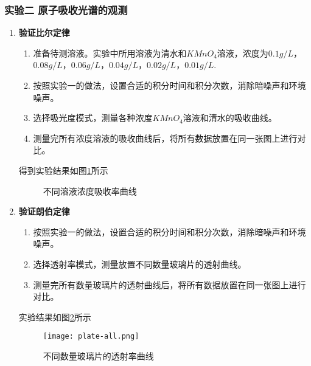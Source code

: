 \documentclass[dvipsnames, svgnames,a4paper,11pt]{article}
\begin{document}
		
		
	

	\subsubsection{实验二 \quad 原子吸收光谱的观测}

		\begin{enumerate}
			\item \textbf{验证比尔定律}
				
				\begin{enumerate}
					\item 准备待测溶液。实验中所用溶液为清水和$KMnO_4$溶液，浓度为$0.1g/L$，$0.08g/L$，$0.06g/L$，$0.04g/L$，$0.02g/L$，$0.01g/L$.
					
					\item 按照实验一的做法，设置合适的积分时间和积分次数，消除暗噪声和环境噪声。
					
					\item 选择吸光度模式，测量各种浓度$KMnO_4$溶液和清水的吸收曲线。
					
					\item 测量完所有浓度溶液的吸收曲线后，将所有数据放置在同一张图上进行对比。
					
				\end{enumerate}
				
				得到实验结果如图\ref{fig:Absorbance}所示
				
				\begin{figure}[htbp]
					\centering
					\caption{不同溶液浓度吸收率曲线}
					\label{fig:Absorbance}			
				\end{figure}
				
			\item \textbf{验证朗伯定律}
			
				\begin{enumerate}
					\item 按照实验一的做法，设置合适的积分时间和积分次数，消除暗噪声和环境噪声。
					
					\item 选择透射率模式，测量放置不同数量玻璃片的透射曲线。
					
					\item 测量完所有数量玻璃片的透射曲线后，将所有数据放置在同一张图上进行对比。
					
				\end{enumerate}
				
				实验结果如图\ref{fig:plate-all}所示
				
				\begin{figure}[htbp]
					\centering
					\texttt{[image: plate-all.png]}
					\caption{不同数量玻璃片的透射率曲线}
					\label{fig:plate-all}
				\end{figure}
			
			
		\end{enumerate}
\end{document}
